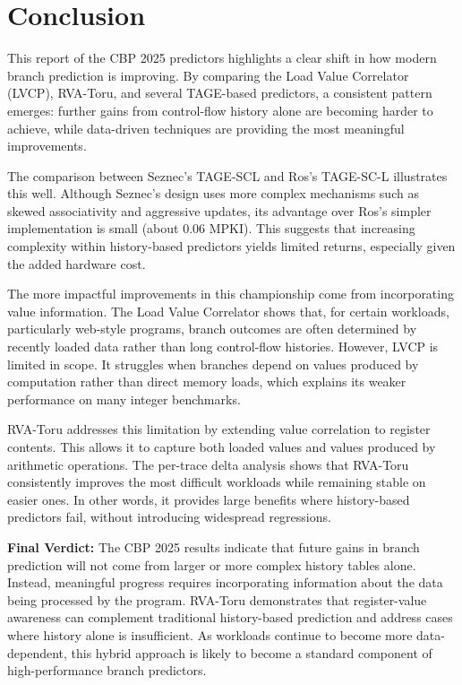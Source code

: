 \documentclass[11pt,a4paper]{article}
\begin{document}
\section{Conclusion}

This report of the CBP 2025 predictors highlights a clear shift in how modern branch prediction is improving. By comparing the Load Value Correlator (LVCP), RVA-Toru, and several TAGE-based predictors, a consistent pattern emerges: further gains from control-flow history alone are becoming harder to achieve, while data-driven techniques are providing the most meaningful improvements.

The comparison between Seznec’s TAGE-SCL and Ros’s TAGE-SC-L illustrates this well. Although Seznec’s design uses more complex mechanisms such as skewed associativity and aggressive updates, its advantage over Ros’s simpler implementation is small (about 0.06 MPKI). This suggests that increasing complexity within history-based predictors yields limited returns, especially given the added hardware cost.

The more impactful improvements in this championship come from incorporating value information. The Load Value Correlator shows that, for certain workloads, particularly web-style programs, branch outcomes are often determined by recently loaded data rather than long control-flow histories. However, LVCP is limited in scope. It struggles when branches depend on values produced by computation rather than direct memory loads, which explains its weaker performance on many integer benchmarks.

RVA-Toru addresses this limitation by extending value correlation to register contents. This allows it to capture both loaded values and values produced by arithmetic operations. The per-trace delta analysis shows that RVA-Toru consistently improves the most difficult workloads while remaining stable on easier ones. In other words, it provides large benefits where history-based predictors fail, without introducing widespread regressions.

\textbf{Final Verdict:}
The CBP 2025 results indicate that future gains in branch prediction will not come from larger or more complex history tables alone. Instead, meaningful progress requires incorporating information about the data being processed by the program. RVA-Toru demonstrates that register-value awareness can complement traditional history-based prediction and address cases where history alone is insufficient. As workloads continue to become more data-dependent, this hybrid approach is likely to become a standard component of high-performance branch predictors.
\end{document}
